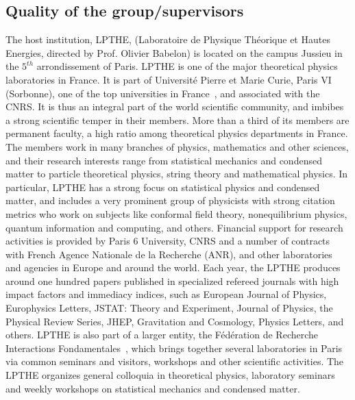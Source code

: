 \documentclass[a4paper,11pt,color]{article}
\begin{document}
\subsection{Quality of the group/supervisors}
\label{sec:gropu_quality}
 {
The host institution, LPTHE, (Laboratoire de Physique Th\'eorique et Hautes Energies, directed by Prof. Olivier Babelon) is located on the campus Jussieu in the $5^{th}$ arrondissement of Paris. LPTHE is one of the major theoretical physics laboratories in France. It is part of Universit\'e Pierre et Marie Curie, Paris VI (Sorbonne), one of the top universities in France~\cite{mcranking}, and associated with the CNRS. It is thus an integral part of the world scientific community, and imbibes a strong scientific temper in their members. More than a third of its members are permanent faculty, a high ratio among theoretical physics departments in France. The members work in many branches of physics, mathematics and other sciences, and their research interests range from  statistical mechanics and condensed matter to particle theoretical physics, string theory and mathematical physics. In particular, LPTHE has a strong focus on statistical physics and condensed matter, and includes a very prominent group of 
physicists with strong citation metrics who work on subjects like conformal field theory, nonequilibrium physics, quantum information and computing, and others. Financial support for research activities is provided by Paris 6 University, CNRS and a number of contracts with  French Agence Nationale de la Recherche (ANR), and other laboratories and agencies in Europe and around the world.  Each year, the LPTHE produces around one hundred papers published in specialized refereed journals with high impact factors and immediacy indices, such as European Journal of Physics, Europhysics Letters, JSTAT: Theory and Experiment, Journal of Physics, the Physical Review Series, JHEP, Gravitation and Cosmology, Physics Letters, and others.  LPTHE is also part of a larger entity, the F\'ed\'eration de Recherche Interactions Fondamentales~\cite{frif}, which brings together several laboratories in Paris via common seminars and visitors, workshops and other scientific activities. The LPTHE organizes general colloquia in 
theoretical physics, laboratory seminars and weekly workshops on statistical mechanics and condensed matter.}
\end{document}
